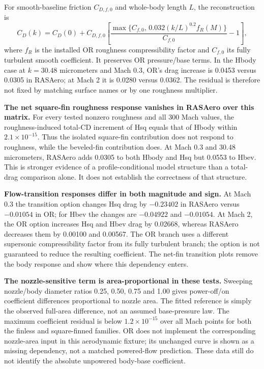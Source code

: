 \documentclass[oneside,openany]{amsdtx}
\begin{document}
For smooth-baseline friction $C_{D,f,0}$ and whole-body length $L$, the reconstruction is
\begin{equation}
 C_D(k)=C_D(0)+C_{D,f,0}\left[\frac{\max\{C_{f,0},\,0.032(k/L)^{0.2}f_R(M)\}}{C_{f,0}}-1\right],
\end{equation}
where $f_R$ is the installed OR roughness compressibility factor and $C_{f,0}$ its fully turbulent smooth coefficient. It preserves OR pressure/base terms. In the Hbody case at $k=30.48$ micrometers and Mach 0.3, OR's drag increase is 0.0453 versus 0.0305 in RASAero; at Mach 2 it is 0.0280 versus 0.0362. The residual is therefore not fixed by matching surface names or by one roughness multiplier.

\textbf{The net square-fin roughness response vanishes in RASAero over this matrix.} For every tested nonzero roughness and all 300 Mach values, the roughness-induced total-CD increment of Hsq equals that of Hbody within $2.1\times10^{-15}$. Thus the isolated square-fin contribution does not respond to roughness, while the beveled-fin contribution does. At Mach 0.3 and 30.48 micrometers, RASAero adds 0.0305 to both Hbody and Hsq but 0.0553 to Hbev. This is stronger evidence of a profile-conditional model structure than a total-drag comparison alone. It does not establish the correctness of that structure.

\textbf{Flow-transition responses differ in both magnitude and sign.} At Mach 0.3 the transition option changes Hsq drag by $-0.23402$ in RASAero versus $-0.01054$ in OR; for Hbev the changes are $-0.04922$ and $-0.01054$. At Mach 2, the OR option increases Hsq and Hbev drag by 0.02668, whereas RASAero decreases them by 0.00100 and 0.00567. The OR branch uses a different supersonic compressibility factor from its fully turbulent branch; the option is not guaranteed to reduce the resulting coefficient. The net-fin transition plots remove the body response and show where this dependency enters.

\textbf{The nozzle-sensitive term is area-proportional in these tests.} Sweeping nozzle/body diameter ratios 0.25, 0.50, 0.75 and 1.00 gives power-off/on coefficient differences proportional to nozzle area. The fitted reference is simply the observed full-area difference, not an assumed base-pressure law. The maximum coefficient residual is below $1.2\times10^{-15}$ over all Mach points for both the finless and square-finned families. OR does not implement the corresponding nozzle-area input in this aerodynamic fixture; its unchanged curve is shown as a missing dependency, not a matched powered-flow prediction. These data still do not identify the absolute unpowered body-base coefficient.
\end{document}
